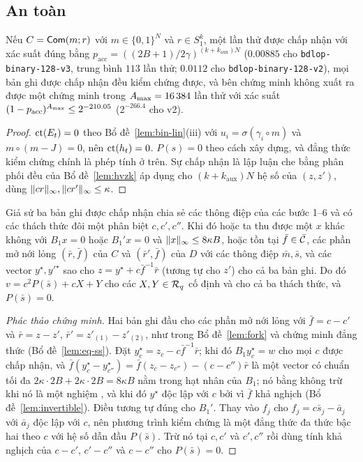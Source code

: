 \subsection{An toàn}

\begin{theorem}
\label{thm:bin-complete}
Nếu $C=\mathsf{Com}(m;r)$ với $m\in\{0,1\}^N$ và $r\in S_1^k$, một lần thử được chấp
nhận với xác suất đúng bằng
$p_{\mathrm{acc}}=((2B+1)/2\gamma)^{(k+k_{\mathrm{aux}})N}$
($0.00885$ cho \texttt{bdlop-binary-128-v3}, trung bình $113$ lần thử;
$0.0112$ cho \texttt{bdlop-binary-128-v2}), mọi bản ghi được chấp nhận đều
kiểm chứng được, và bên chứng minh không xuất ra được một chứng minh trong
$A_{\max}=16\,384$ lần thử với xác suất $(1-p_{\mathrm{acc}})^{A_{\max}}\le2^{-210.05}$
($2^{-266.4}$ cho v2).
\end{theorem}
\begin{proof}
$\mathrm{ct}(E_t)=0$ theo Bổ đề~\ref{lem:bin-lin}(iii) với $u_i=\sigma(\gamma_i\circ m)$
và $m\circ(m-J)=0$, nên $\mathrm{ct}(h_t)=0$. $P(s)=0$ theo cách xây dựng, và đẳng
thức kiểm chứng chính là phép tính ở trên. Sự chấp nhận là lập luận che bằng
phân phối đều của Bổ đề~\ref{lem:hvzk} áp dụng cho
$(k+k_{\mathrm{aux}})N$ hệ số của $(z,z')$, dùng
$\lVert cr \rVert_\infty,\lVert cr' \rVert_\infty\le\kappa$.
\end{proof}

\begin{lemma}
\label{lem:bin-consistent}
Giả sử ba bản ghi được chấp nhận chia sẻ các thông điệp của các bước 1--6 và có
các thách thức đôi một phân biệt $c,c',c''$. Khi đó hoặc ta thu được một $x$
khác không với $B_1x=0$ hoặc $B_1'x=0$ và $\lVert x \rVert_\infty\le8\kappa B$, hoặc
tồn tại $\bar f\in\bar{\mathcal{C}}$, các phần mở nới lỏng $(\bar r,\bar f)$ của $C$ và
$(\bar r',\bar f)$ của $D$ với các thông điệp $\bar m,\bar s$, và các vector
$y^\star,y'^\star$ sao cho $z=y^\star+c\bar f^{-1}\bar r$ (tương tự cho
$z'$) cho cả ba bản ghi. Do đó
$v=c^2P(\bar s)+cX+Y$ cho các $X,Y\in\mathcal{R}_q$ cố định và cho cả ba thách thức, và
$P(\bar s)=0$.
\end{lemma}
\begin{proof}[Phác thảo chứng minh]
Hai bản ghi đầu cho các phần mở nới lỏng với $\bar f=c-c'$ và
$\bar r=z-z'$, $\bar r'=z'_{(1)}-z'_{(2)}$, như trong Bổ đề~\ref{lem:fork} và
chứng minh đẳng thức (Bổ đề~\ref{lem:eq-ss}). Đặt $y^\star_c=z_c-c\bar f^{-1}\bar r$;
khi đó $B_1y^\star_c=w$ cho mọi $c$ được chấp nhận, và
$\bar f(y^\star_c-y^\star_{c''})=\bar f(z_c-z_{c''})-(c-c'')\bar r$ là một vector
có chuẩn tối đa $2\kappa\cdot2B+2\kappa\cdot2B=8\kappa B$ nằm trong hạt nhân của
$B_1$; nó bằng không trừ khi nó là một nghiệm \MSIS{}, và khi đó $y^\star$ độc
lập với $c$ bởi vì $\bar f$ khả nghịch
(Bổ đề~\ref{lem:invertible}). Điều tương tự đúng cho $B_1'$. Thay vào
$f_j$ cho $f_j=c\bar s_j-\bar a_j$ với $\bar a_j$ độc lập với $c$, nên phương
trình kiểm chứng là một đẳng thức đa thức bậc hai theo $c$ với hệ số dẫn đầu
$P(\bar s)$. Trừ nó tại $c,c'$ và $c',c''$ rồi dùng tính khả nghịch của
$c-c'$, $c'-c''$ và $c-c''$ cho $P(\bar s)=0$.
\end{proof}


